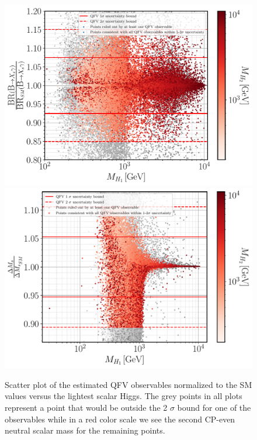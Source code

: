\begin{figure}[H]
\centering
\includegraphics[width=.49\textwidth]{Images/3HDM/Reds/Xsgamma_H1_H2.pdf}
\includegraphics[width=.49\textwidth]{Images/3HDM/Reds/DeltaMs_H1_H2.pdf}
	\caption{ Scatter plot of the estimated QFV observables normalized to the SM values versus the lightest scalar Higgs. The grey points in all plots represent a point that would be outside the 2 $\sigma$ bound for one of the observables while in a red color scale we see the second CP-even neutral scalar mass for the remaining points. %
	}
	\label{fig:3HDM_Flavour}
\end{figure}



